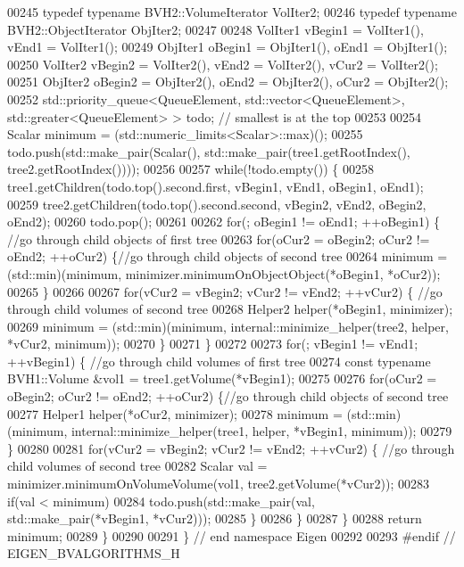 \begin{DoxyCode}
00245   \textcolor{keyword}{typedef} \textcolor{keyword}{typename} BVH2::VolumeIterator VolIter2;
00246   \textcolor{keyword}{typedef} \textcolor{keyword}{typename} BVH2::ObjectIterator ObjIter2;
00247 
00248   VolIter1 vBegin1 = VolIter1(), vEnd1 = VolIter1();
00249   ObjIter1 oBegin1 = ObjIter1(), oEnd1 = ObjIter1();
00250   VolIter2 vBegin2 = VolIter2(), vEnd2 = VolIter2(), vCur2 = VolIter2();
00251   ObjIter2 oBegin2 = ObjIter2(), oEnd2 = ObjIter2(), oCur2 = ObjIter2();
00252   std::priority\_queue<QueueElement, std::vector<QueueElement>, std::greater<QueueElement> > todo; \textcolor{comment}{//
      smallest is at the top}
00253 
00254   Scalar minimum = (std::numeric\_limits<Scalar>::max)();
00255   todo.push(std::make\_pair(Scalar(), std::make\_pair(tree1.getRootIndex(), tree2.getRootIndex())));
00256 
00257   \textcolor{keywordflow}{while}(!todo.empty()) \{
00258     tree1.getChildren(todo.top().second.first, vBegin1, vEnd1, oBegin1, oEnd1);
00259     tree2.getChildren(todo.top().second.second, vBegin2, vEnd2, oBegin2, oEnd2);
00260     todo.pop();
00261 
00262     \textcolor{keywordflow}{for}(; oBegin1 != oEnd1; ++oBegin1) \{ \textcolor{comment}{//go through child objects of first tree}
00263       \textcolor{keywordflow}{for}(oCur2 = oBegin2; oCur2 != oEnd2; ++oCur2) \{\textcolor{comment}{//go through child objects of second tree}
00264         minimum = (std::min)(minimum, minimizer.minimumOnObjectObject(*oBegin1, *oCur2));
00265       \}
00266 
00267       \textcolor{keywordflow}{for}(vCur2 = vBegin2; vCur2 != vEnd2; ++vCur2) \{ \textcolor{comment}{//go through child volumes of second tree}
00268         Helper2 helper(*oBegin1, minimizer);
00269         minimum = (std::min)(minimum, internal::minimize\_helper(tree2, helper, *vCur2, minimum));
00270       \}
00271     \}
00272 
00273     \textcolor{keywordflow}{for}(; vBegin1 != vEnd1; ++vBegin1) \{ \textcolor{comment}{//go through child volumes of first tree}
00274       \textcolor{keyword}{const} \textcolor{keyword}{typename} BVH1::Volume &vol1 = tree1.getVolume(*vBegin1);
00275 
00276       \textcolor{keywordflow}{for}(oCur2 = oBegin2; oCur2 != oEnd2; ++oCur2) \{\textcolor{comment}{//go through child objects of second tree}
00277         Helper1 helper(*oCur2, minimizer);
00278         minimum = (std::min)(minimum, internal::minimize\_helper(tree1, helper, *vBegin1, minimum));
00279       \}
00280 
00281       \textcolor{keywordflow}{for}(vCur2 = vBegin2; vCur2 != vEnd2; ++vCur2) \{ \textcolor{comment}{//go through child volumes of second tree}
00282         Scalar val = minimizer.minimumOnVolumeVolume(vol1, tree2.getVolume(*vCur2));
00283         \textcolor{keywordflow}{if}(val < minimum)
00284           todo.push(std::make\_pair(val, std::make\_pair(*vBegin1, *vCur2)));
00285       \}
00286     \}
00287   \}
00288   \textcolor{keywordflow}{return} minimum;
00289 \}
00290 
00291 \} \textcolor{comment}{// end namespace Eigen}
00292 
00293 \textcolor{preprocessor}{#endif // EIGEN\_BVALGORITHMS\_H}
\end{DoxyCode}
